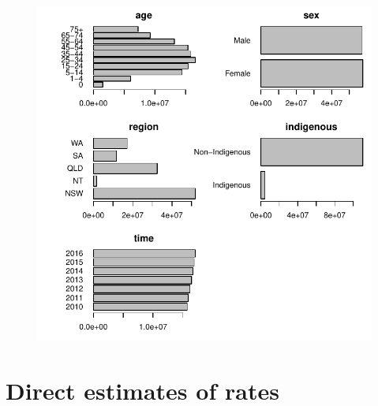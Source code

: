 \documentclass{article}
\begin{document}
\begin{figure}
  \centering
  \includegraphics{out/fig_data_population}
\end{figure}
\newpage

\clearpage
\section{Direct estimates of rates}
\newpage
\end{document}
